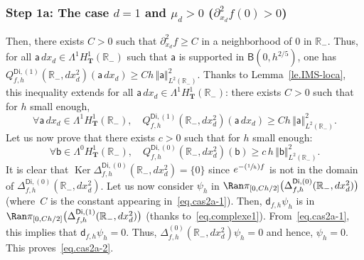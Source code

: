 \documentclass[JEP,XML,SOM,Unicode,NoEqCountersInSection,NoFloatCountersInSection,published]{cedram}
\newcommand{\Psfrac}[2]{(\sfrac{#1}{#2})}
\newcommand{\mbf}[1]{\mathbf{#1}}
\DeclareMathOperator\Ker{Ker}
\theoremstyle{plain}
\theoremstyle{definition}
\begin{document}
\subsubsection*{Step 1a: The case $d=1$ and $\mu_{d}>0$ (\ie $ \partial_{x_d}^2 f(0)>0$)}
Then, there exists $C>0$ such that $\partial_{x_d}^2 f\ge C$ in a neighborhood of $0$ in $\mathbb R_-$.
Thus, for all $\mathsf a \, dx_d\in \Lambda^1 H^1_{\mbf T}(\mathbb R_-)$ such that $\mathsf a$ is supported in $\mathsf B(0,h^{2/5 })$, one has $
Q_{f,h}^{\mathsf{Di},(1)}(\mathbb R_-, dx_d^2)(\mathsf a \, dx_d)\ge Ch\, \Vert \mathsf a \Vert_{L^2(\mathbb R_-)}^2$.
Thanks to Lemma~\ref{le.IMS-loca}, this inequality extends for all $\mathsf a \, d x_d\in \Lambda^1 H^1_{\mbf T}(\mathbb R_-)$: there exists $C>0$ such that for $h$ small enough,
\begin{equation}\label{eq.cas2a-1}
\forall \mathsf a\, d x_d\in \Lambda^1 H^1_{\mbf T}(\mathbb R_-), \quad Q_{f,h}^{\mathsf{Di},(1)}(\mathbb R_-, dx_d^2)(\mathsf a \, dx_d)\ge Ch\, \Vert \mathsf a \Vert_{L^2(\mathbb R_-)}^2.
\end{equation}
Let us now prove that there exists $c>0$ such that for $h$ small enough:
\begin{equation}\label{eq.cas2a-2}
\forall \mathsf b\in \Lambda^0 H^1_{\mbf T}(\mathbb R_-),\quad Q_{f,h}^{\mathsf{Di},(0)}(\mathbb R_-, dx_d^2)(\mathsf b)\ge c \, h\, \Vert \mathsf b \Vert_{L^2(\mathbb R_-)}^2.
\end{equation}
It is clear that $\Ker \Delta_{f,h}^{\mathsf{Di},(0)}(\mathbb R_-,
dx_d^2)=\{0\}$ since $e^{-\Psfrac 1hf}$ is not in the domain of
$\Delta_{f,h}^{\mathsf{Di},(0)}(\mathbb R_-, dx_d^2)$. Let us now
consider $\psi_h$ in $\Ran \pi_{[0,Ch/2]}\bigl(\Delta_{f,h}^{\mathsf{Di},(0)}(\mathbb R_-,dx_d^2)\bigr)$
(where~$C$ is the constant appearing in~\eqref{eq.cas2a-1}). Then,
$\mathsf d_{f,h} \psi_h$ is in $\Ran \pi_{[0,Ch/2]}
\bigl(\Delta_{f,h}^{\mathsf{Di},(1)}(\mathbb R_-,dx_d^2) \bigr) $ (thanks to~\eqref{eq.complexe1}). From~\eqref{eq.cas2a-1}, this implies that $\mathsf d_{f,h}\psi_h=0$. Thus, $\Delta_{f,h}^{(0)}(\mathbb R_-, dx_d^2)\psi_h=0$ and hence, $\psi_h=0$. This proves~\eqref{eq.cas2a-2}.
\end{document}
